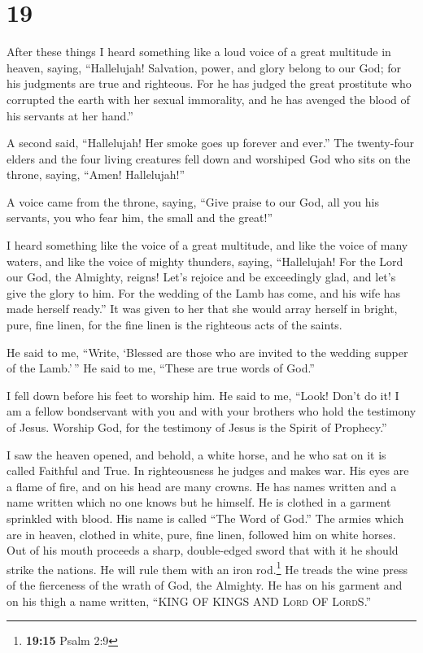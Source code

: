 \hypertarget{section-18}{%
\section{19}\label{section-18}}

 After these things I heard something like a loud voice of
a great multitude in heaven, saying, ``Hallelujah! Salvation, power, and
glory belong to our God;  for his judgments are true and
righteous. For he has judged the great prostitute who corrupted the
earth with her sexual immorality, and he has avenged the blood of his
servants at her hand.''

 A second said, ``Hallelujah! Her smoke goes up forever
and ever.''  The twenty-four elders and the four living
creatures fell down and worshiped God who sits on the throne, saying,
``Amen! Hallelujah!''

 A voice came from the throne, saying, ``Give praise to
our God, all you his servants, you who fear him, the small and the
great!''

 I heard something like the voice of a great multitude,
and like the voice of many waters, and like the voice of mighty
thunders, saying, ``Hallelujah! For the Lord our God, the Almighty,
reigns!  Let's rejoice and be exceedingly glad, and let's
give the glory to him. For the wedding of the Lamb has come, and his
wife has made herself ready.''  It was given to her that
she would array herself in bright, pure, fine linen, for the fine linen
is the righteous acts of the saints.

 He said to me, ``Write, `Blessed are those who are
invited to the wedding supper of the Lamb.'\,'' He said to me, ``These
are true words of God.''

 I fell down before his feet to worship him. He said to
me, ``Look! Don't do it! I am a fellow bondservant with you and with
your brothers who hold the testimony of Jesus. Worship God, for the
testimony of Jesus is the Spirit of Prophecy.''

 I saw the heaven opened, and behold, a white horse, and
he who sat on it is called Faithful and True. In righteousness he judges
and makes war.  His eyes are a flame of fire, and on his
head are many crowns. He has names written and a name written which no
one knows but he himself.  He is clothed in a garment
sprinkled with blood. His name is called ``The Word of God.''
 The armies which are in heaven, clothed in white, pure,
fine linen, followed him on white horses.  Out of his
mouth proceeds a sharp, double-edged sword that with it he should strike
the nations. He will rule them with an iron rod.\footnote{\textbf{19:15}
  Psalm 2:9} He treads the wine press of the fierceness of the wrath of
God, the Almighty.  He has on his garment and on his
thigh a name written, ``KING OF KINGS AND \textsc{Lord} OF
\textsc{Lord}S.''

